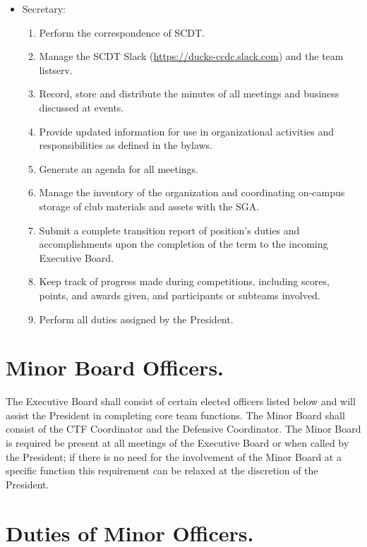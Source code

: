 \documentclass[12pt]{constitution}
\begin{document}
\begin{itemize}
    \item Secretary:
        \begin{enumerate}
            \item Perform the correspondence of SCDT.
            \item Manage the SCDT Slack (\url{https://ducks-ccdc.slack.com}) and the team listserv.
            \item Record, store and distribute the minutes of all meetings and
            business discussed at events.
            \item Provide updated information for use in organizational
            activities and responsibilities as defined in the bylaws.
            \item Generate an agenda for all meetings.
            \item Manage the inventory of the organization and coordinating
            on-campus storage of club materials and assets with the SGA.
            \item Submit a complete transition report of position’s duties and
            accomplishments upon the completion of the term to the incoming
            Executive Board.
            \item Keep track of progress made during competitions, including
            scores, points, and awards given, and participants or subteams
            involved.
            \item Perform all duties assigned by the President.
        \end{enumerate}
\end{itemize}

\section{Minor Board Officers.}\label{sec:MINOR-OFFICERS}

The Executive Board shall consist of certain elected officers listed below and
will assist the President in completing core team functions. The Minor Board
shall consist of the CTF Coordinator and the Defensive Coordinator. The Minor
Board is required be present at all meetings of the Executive Board or when
called by the President; if there is no need for the involvement of the Minor
Board at a specific function this requirement can be relaxed at the discretion
of the President.

\section{Duties of Minor Officers.}\label{sec:MINOR-DUTIES}
\end{document}
